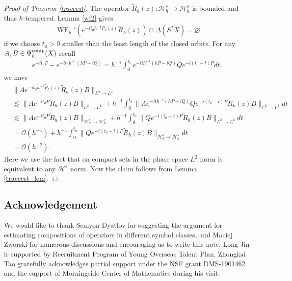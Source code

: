 \documentclass[reqno,12pt,letterpaper]{amsart}
\numberwithin{equation}{section}
\numberwithin{prop}{section}
\DeclareMathOperator{\WF}{WF}
\newcommand{\Hcal}{{\mathcal H}}
\newcommand{\Ocal}{{\mathcal O}}
\begin{document}
\begin{proof}[Proof of Theorem \ref{traceest}]
The operator $\widetilde{R}_h(z):\mathcal{H}^s_h\to\mathcal{H}^s_h$ is bounded and thus $h$-tempered. Lemma \ref{wf2} gives
\begin{align*}
    \WF_h'(e^{-it_0h^{-1}\widetilde{P}_h(z)}\widetilde{R}_h(z))\cap \Delta(S^*X)=\varnothing
\end{align*}
if we choose $t_0>0$ smaller than the least length of the closed orbits. For any $A,B\in\Psi^{\rm comp}_h(X)$ recall
\begin{align*}
    e^{-it_0P}- e^{-it_0h^{-1}(hP-iQ)}=h^{-1}\int_0^{t_0}e^{-ith^{-1}(hP-iQ)}Qe^{-i(t_0-t)P}dt,
\end{align*}
we have
\begin{align*}
    &\|Ae^{-it_0h^{-1}\widetilde{P}_h(z)} \widetilde{R}_h(z)B\|_{L^2\to L^2}\\
    &\lesssim  \|Ae^{-it_0P} \widetilde{R}_h(z)B\|_{L^2\to L^2}+h^{-1}\int_0^{t_0}\|Ae^{-ith^{-1}(hP-iQ)}Qe^{-i(t_0-t)P}\widetilde{R}_h(z)B\|_{L^2\to L^2}dt\\
    &\lesssim  \|Ae^{-it_0P} \widetilde{R}_h(z)B\|_{\Hcal^s_h\to \Hcal^s_h}+h^{-1}\int_0^{t_0}\|Qe^{-i(t_0-t)P}\widetilde{R}_h(z)B\|_{L^2\to L^2}dt\\
    &=\Ocal(h^{-1})+h^{-1}\int_0^{t_0}\|Qe^{-i(t_0-t)P}\widetilde{R}_h(z)B\|_{\Hcal^s_h\to \Hcal^s_h}dt\\
    &=\Ocal(h^{-2}).
\end{align*}
Here we use the fact that on compact sets in the phase space $L^2$ norm is equivalent to any $\mathcal{H}^s$ norm. Now the claim follows from Lemma \ref{traceest_lem}.
\end{proof}


\subsection*{Acknowledgement}
We would like to thank Semyon Dyatlov for suggesting the argument for estimating compositions of operators in different symbol classes, and Maciej Zworski for numerous discussions and encouraging us to write this note. Long Jin is supported by Recruitment Program of Young
Overseas Talent Plan. Zhongkai Tao gratefully acknowledges partial support under the NSF grant DMS-1901462 and the support of Morningside Center of Mathematics during his visit.
\end{document}
